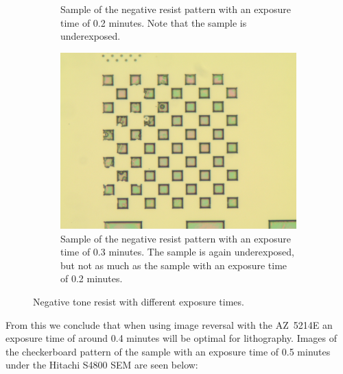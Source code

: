\begin{figure}[ht]
\begin{subfigure}[t]{0.3\linewidth}
	\caption{Sample of the negative resist pattern with an exposure time of 0.2 minutes. Note that the sample is underexposed.}
	\label{fig:b2h1}
    \end{subfigure}
    \hfill
    \begin{subfigure}[t]{0.3\linewidth}
        \centering
        \includegraphics[width=\textwidth]{data/b2i1.jpg}
	\caption{Sample of the negative resist pattern with an exposure time of 0.3 minutes. The sample is again underexposed, but not as much as the sample with an exposure time of 0.2 minutes.}
	\label{fig:b2i1}
    \end{subfigure}
    \hfill
    \caption{Negative tone resist with different exposure times.}
\end{figure}



From this we conclude that when using image reversal with the AZ~5214E an exposure time of around 0.4 minutes will be optimal for lithography. Images of the checkerboard pattern of the sample with an exposure time of 0.5 minutes under the Hitachi S4800 SEM are seen below:


